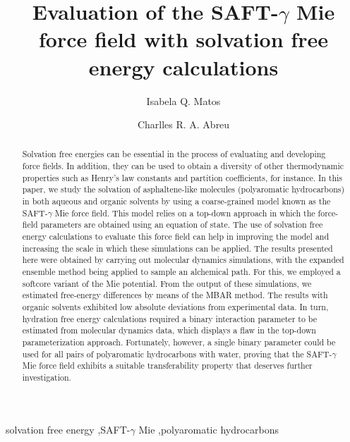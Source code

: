 \documentclass[final,12p,times,twocolumn]{elsarticle}
\begin{document}
	
	\begin{frontmatter}
		
		\title{Evaluation of the SAFT-$\gamma$ Mie force field with solvation free energy calculations}%
		
		\author{Isabela Q. Matos}
		\author{Charlles R. A. Abreu }
		\address{Chemical Engineering Department, Escola de Qu\'{i}mica, Universidade Federal do Rio de Janeiro, Av. Athos da Silveira Ramos 149, Rio de Janeiro, RJ 21941-909, Brazil}
		
		
		\begin{abstract}
Solvation free energies can be essential in the process of evaluating and developing force fields. In addition, they can be used to obtain a diversity of other thermodynamic properties such as Henry's law constants and partition coefficients, for instance. In this paper, we study the solvation of asphaltene-like molecules (polyaromatic hydrocarbons) in both aqueous and organic solvents by using a coarse-grained model known as the SAFT-$\gamma$ Mie force field. This model relies on a top-down approach in which the force-field parameters are obtained using an equation of state. The use of solvation free energy calculations to evaluate this force field can help in improving the model and increasing the scale in which these simulations can be applied. The results presented here were obtained by carrying out molecular dynamics simulations, with the expanded ensemble method being applied to sample an alchemical path. For this, we employed a softcore variant of the Mie potential. From the output of these simulations, we estimated free-energy differences by means of the MBAR method. The results with organic solvents exhibited low absolute deviations from experimental data. In turn, hydration free energy calculations required a binary interaction parameter to be estimated from molecular dynamics data, which displays a flaw in the top-down parameterization approach. Fortunately, however, a single binary parameter could be used for all pairs of polyaromatic hydrocarbons with water, proving that the SAFT-$\gamma$ Mie force field exhibits a suitable transferability property that deserves further investigation.
		\end{abstract}
		
		
		
		\begin{keyword}
			solvation free energy \sep SAFT-$\gamma$ Mie \sep polyaromatic hydrocarbons
		\end{keyword}
		
	\end{frontmatter}
	
\end{document}
